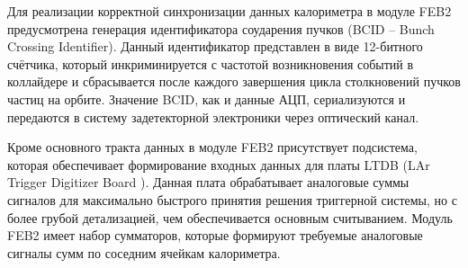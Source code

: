 Для реализации корректной синхронизации данных калориметра в модуле FEB2 предусмотрена генерация идентификатора соударения пучков (BCID -- Bunch Crossing Identifier). Данный идентификатор представлен в виде 12-битного счётчика, который инкриминируется с частотой возникновения событий в коллайдере и сбрасывается после каждого завершения цикла столкновений пучков частиц на орбите. Значение BCID, как и данные АЦП, сериализуются и передаются в систему задетекторной электроники через оптический канал.\par
Кроме основного тракта данных в модуле FEB2 присутствует подсистема, которая обеспечивает формирование входных данных для платы LTDB (LAr Trigger Digitizer Board \parencite{ltdb}). Данная плата обрабатывает аналоговые суммы сигналов для максимально быстрого принятия решения триггерной системы, но с более грубой детализацией, чем обеспечивается основным считыванием. Модуль FEB2 имеет набор сумматоров, которые формируют требуемые аналоговые сигналы сумм по соседним ячейкам калориметра.\par
